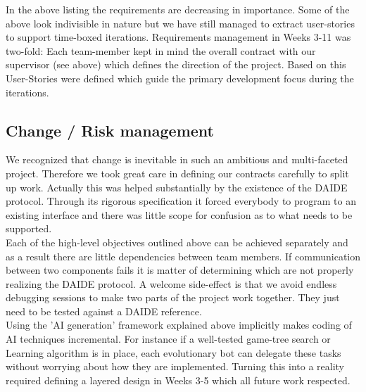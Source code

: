 \documentclass[11pt]{article}
\begin{document}
In the above listing the requirements are decreasing in importance. Some of
the above look indivisible in nature but we have still managed to
extract user-stories to support time-boxed iterations. Requirements management
in Weeks 3-11 was two-fold: Each team-member kept in mind the overall contract
with our supervisor (see above) which defines the direction of the project. 
Based on this User-Stories were defined which guide the primary development
focus during the iterations.

\subsection{Change / Risk management}
We recognized that change is inevitable in such an ambitious and multi-faceted
project. Therefore we took great care in defining our contracts carefully to
split up work. Actually this was helped substantially by the existence of the
DAIDE protocol. Through its rigorous specification it forced everybody to 
program to an existing interface and there was little scope for confusion as
to what needs to be supported. 
\\
Each of the high-level objectives outlined above can be achieved
separately and as a result there are little dependencies between team members.
If communication between two components fails it is matter of determining
which are not properly realizing the DAIDE protocol. A welcome side-effect
is that we avoid endless debugging sessions to make two parts of the project
work together. They just need to be tested against a DAIDE reference.
\\
Using the 'AI generation' framework explained above implicitly makes coding 
of AI techniques incremental. For instance if a well-tested game-tree search
or Learning algorithm is in place, each evolutionary bot can delegate
these tasks without worrying about how they are implemented. Turning this
into a reality required defining a layered design in Weeks 3-5 which all
future work respected.
\\ 
\end{document}

